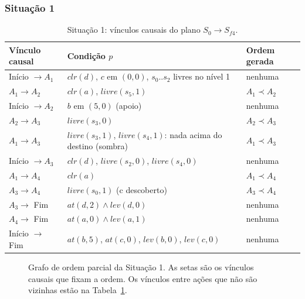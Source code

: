 \documentclass[11pt,a4paper]{article}
\newcommand{\clr}{\mathit{clr}}
\newcommand{\at}{\mathit{at}}
\newcommand{\lev}{\mathit{lev}}
\newcommand{\livre}{\mathit{livre}}
\begin{document}
\subsubsection{Situação 1}
\begin{table}[H]
\centering\small
\begin{tabular}{@{}lll@{}}
\toprule
Vínculo causal & Condição $p$ & Ordem gerada\\
\midrule
Início $\to A_1$ & $\clr(d)$, $c$ em $(0,0)$, $s_0..s_2$ livres no nível 1 & nenhuma\\
$A_1 \to A_2$ & $\clr(a)$, $\livre(s_5,1)$ & $A_1\prec A_2$\\
Início $\to A_2$ & $b$ em $(5,0)$ (apoio) & nenhuma\\
$A_2 \to A_3$ & $\livre(s_3,0)$ & $A_2\prec A_3$\\
$A_1 \to A_3$ & $\livre(s_3,1)$, $\livre(s_4,1)$: nada acima do destino (sombra) & $A_1\prec A_3$\\
Início $\to A_3$ & $\clr(d)$, $\livre(s_2,0)$, $\livre(s_4,0)$ & nenhuma\\
$A_1 \to A_4$ & $\clr(a)$ & $A_1\prec A_4$\\
$A_3 \to A_4$ & $\livre(s_0,1)$ (c descoberto) & $A_3\prec A_4$\\
$A_3 \to$ Fim & $\at(d,2)\land\lev(d,0)$ & nenhuma\\
$A_4 \to$ Fim & $\at(a,0)\land\lev(a,1)$ & nenhuma\\
Início $\to$ Fim & $\at(b,5)$, $\at(c,0)$, $\lev(b,0)$, $\lev(c,0)$ & nenhuma\\
\bottomrule
\end{tabular}
\caption{Situação 1: vínculos causais do plano $S_0\to S_{f4}$.}
\label{tab:pop}
\end{table}

\begin{figure}[H]
\centering
{}
\caption{Grafo de ordem parcial da Situação 1. As setas são os vínculos causais
que fixam a ordem. Os vínculos entre ações que não são vizinhas estão na
Tabela~\ref{tab:pop}.}
\label{fig:pop}
\end{figure}
\end{document}
